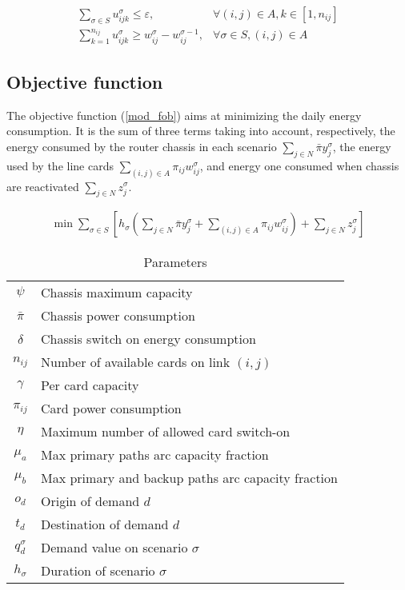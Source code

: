 \documentclass[final,5p,times,twocolumn]{elsarticle}
\begin{document}
\begin{eqnarray}
\label{mod:max_switch}\sum_{\sigma \in S} u_{ijk}^\sigma \leq \varepsilon, & \forall (i,j) \in A, k \in [1,n_{ij}] \\
\label{mod:card_state}\sum_{k=1}^{n_{ij}} u_{ijk}^\sigma \geq w_{ij}^{\sigma} - w_{ij}^{\sigma-1}, & \forall \sigma \in S, (i,j) \in A 
\end{eqnarray}

\subsection{Objective function}
The objective function (\ref{mod_fob}) aims at minimizing the daily energy consumption. It is the sum of three terms taking into account, respectively, the energy consumed by the router chassis in each scenario $\displaystyle \sum_{j \in N} \bar{\pi} y_{j}^{\sigma} $, the energy used by the line cards $\displaystyle\sum_{(i,j) \in A} \pi_{ij}w_{ij}^{\sigma}$, and energy one consumed when chassis are reactivated $\displaystyle\sum_{j \in N} z_{j}^{\sigma}$.

\begin{eqnarray}\label{mod_fob}
\min\sum_{\sigma \in S}\left[h_{\sigma}\left(\sum_{j \in N} \bar{\pi} y_{j}^{\sigma}
+\sum_{(i,j) \in A} \pi_{ij}w_{ij}^{\sigma}\right)
+ \sum_{j \in N} z_{j}^{\sigma}\right] \end{eqnarray}



\begin{table}[htc]
\begin{tabular}{c|l}
\hline
$\psi$ & Chassis maximum capacity\\
$\bar{\pi}$ & Chassis power consumption\\
$\delta$ & Chassis switch on energy consumption\\
\hline
$n_{ij}$ & Number of available cards on link $(i,j)$ \\
$\gamma$ & Per card capacity\\$\pi_{ij}$ & Card power consumption\\\hline
$\eta$ & Maximum number of allowed card switch-on\\
$\mu_a$ & Max  primary paths arc capacity fraction\\
$\mu_b$ & Max primary and backup paths arc capacity fraction\\
\hline
$o_d$ & Origin of demand $d$\\
$t_d$ & Destination of demand $d$\\
$q_d^{\sigma}$ & Demand value on scenario $\sigma$\\
$h_{\sigma}$ & Duration of scenario $\sigma$\\
\hline
\end{tabular}
\caption{Parameters}\label{tab::parameters}
\end{table}
\end{document}

